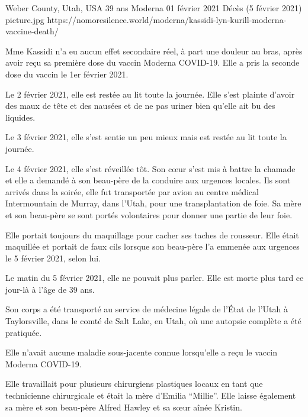 {Weber County, Utah, USA}
{39 ans}
{Moderna}
{01 février 2021}
{Décès (5 février 2021)}
{picture.jpg}
{https://nomoresilence.world/moderna/kassidi-lyn-kurill-moderna-vaccine-death/}
{

Mme Kassidi n'a eu aucun effet secondaire réel, à part une douleur au bras,
après avoir reçu sa première dose du vaccin Moderna COVID-19. Elle a pris la
seconde dose du vaccin le 1er février 2021.

Le 2 février 2021, elle est restée au lit toute la journée. Elle s'est plainte
d'avoir des maux de tête et des nausées et de ne pas uriner bien qu'elle ait bu
des liquides.

Le 3 février 2021, elle s'est sentie un peu mieux mais est restée au lit toute
la journée.

Le 4 février 2021, elle s'est réveillée tôt. Son cœur s'est mis à battre la
chamade et elle a demandé à son beau-père de la conduire aux urgences
locales. Ils sont arrivés dans la soirée, elle fut transportée par avion au
centre médical Intermountain de Murray, dans l'Utah, pour une transplantation de
foie. Sa mère et son beau-père se sont portés volontaires pour donner une partie
de leur foie.

Elle portait toujours du maquillage pour cacher ses taches de rousseur. Elle
était maquillée et portait de faux cils lorsque son beau-père l'a emmenée aux
urgences le 5 février 2021, selon lui.

Le matin du 5 février 2021, elle ne pouvait plus parler. Elle est morte plus
tard ce jour-là à l'âge de 39 ans.

Son corps a été transporté au service de médecine légale de l'État de l'Utah à
Taylorsville, dans le comté de Salt Lake, en Utah, où une autopsie complète a
été pratiquée.

Elle n'avait aucune maladie sous-jacente connue lorsqu'elle a reçu le vaccin
Moderna COVID-19.

Elle travaillait pour plusieurs chirurgiens plastiques locaux en tant que
technicienne chirurgicale et était la mère d'Emilia “Millie”. Elle laisse
également sa mère et son beau-père Alfred Hawley et sa sœur aînée Kristin.

}

